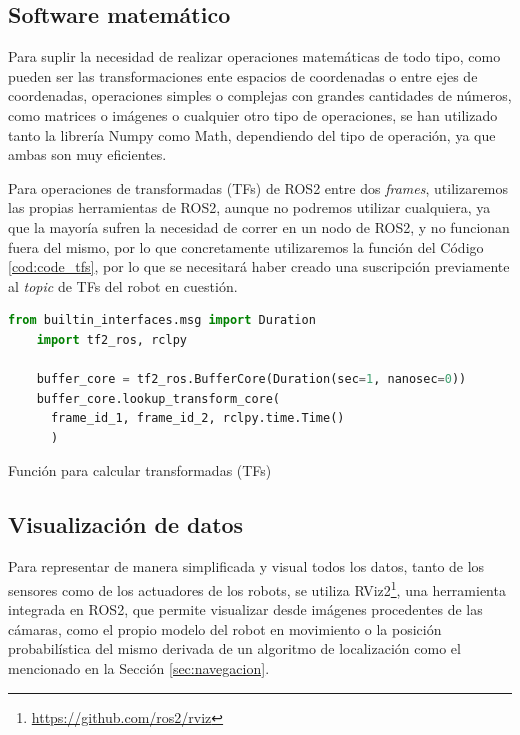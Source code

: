 \subsection{Software matemático}
\label{sec:software_matematico}

Para suplir la necesidad de realizar operaciones matemáticas de todo tipo, como
pueden ser las transformaciones ente espacios de coordenadas o entre ejes de
coordenadas, operaciones simples o complejas con grandes cantidades de números,
como matrices o imágenes o cualquier otro tipo de operaciones, se han utilizado
tanto la librería Numpy como Math, dependiendo del tipo de operación, ya que
ambas son muy eficientes.

Para operaciones de transformadas (TFs) de ROS2 entre dos \textit{frames},
utilizaremos las propias herramientas de ROS2, aunque no podremos utilizar
cualquiera, ya que la mayoría sufren la necesidad de correr en un nodo de ROS2,
y no funcionan fuera del mismo, por lo que concretamente utilizaremos la
función del Código \ref{cod:code_tfs}, por lo que se necesitará haber creado una
suscripción previamente al \textit{topic} de TFs del robot en cuestión.

\begin{code}[h!]
  \begin{lstlisting}[language=Python]
    from builtin_interfaces.msg import Duration
    import tf2_ros, rclpy

    buffer_core = tf2_ros.BufferCore(Duration(sec=1, nanosec=0))
    buffer_core.lookup_transform_core(
      frame_id_1, frame_id_2, rclpy.time.Time()
      )
  \end{lstlisting}
  \caption[Función para calcular transformadas]{Función para calcular transformadas (TFs)}
  \label{cod:code_tfs}
\end{code}


\subsection{Visualización de datos}
\label{sec:visualizacion_datos}

Para representar de manera simplificada y visual todos los datos, tanto de los
sensores como de los actuadores de los robots, se utiliza
RViz2\footnote{\url{https://github.com/ros2/rviz}}, una herramienta integrada en
ROS2, que permite visualizar desde imágenes procedentes de las cámaras, como el
propio modelo del robot en movimiento o la posición probabilística del mismo
derivada de un algoritmo de localización como el mencionado en la Sección
\ref{sec:navegacion}.

